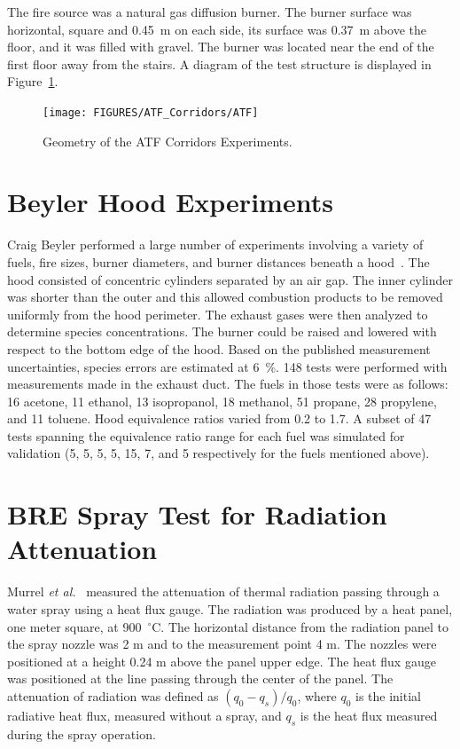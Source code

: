 The fire source was a natural gas diffusion burner.  The burner surface was horizontal, square and 0.45~m on each side, its surface was 0.37~m above the floor, and it was filled with gravel.
The burner was located near the end of the first floor away from the stairs. A diagram of the test structure is displayed in Figure~\ref{ATF Drawing}.


\begin{figure}
\begin{center}
\texttt{[image: FIGURES/ATF\_Corridors/ATF]}
\end{center}
\caption{Geometry of the ATF Corridors Experiments.}
\label{ATF Drawing}
\end{figure}

\clearpage



\section{Beyler Hood Experiments}

Craig Beyler performed a large number of experiments involving a variety of fuels, fire sizes, burner diameters, and
burner distances beneath a hood~\cite{Beyler:Hood}.  The hood consisted of concentric cylinders separated
by an air gap.  The inner cylinder was shorter than the outer and this allowed combustion products to be removed
uniformly from the hood perimeter.  The exhaust gases were then analyzed to determine species concentrations.
The burner could be raised and lowered with respect to the bottom edge of the hood.  Based on the published
measurement uncertainties, species errors are estimated at 6~\%.  148 tests were performed with measurements made in the
exhaust duct.  The fuels in those tests were as follows: 16 acetone, 11 ethanol, 13 isopropanol, 18 methanol, 51 propane, 28 propylene, and 11 toluene.
Hood equivalence ratios varied from 0.2 to 1.7.  A subset of 47 tests spanning the equivalence ratio range for each fuel was simulated for
validation (5, 5, 5, 5, 15, 7, and 5 respectively for the fuels mentioned above).



\section{BRE Spray Test for Radiation Attenuation}

Murrel {\em et al.}~\cite{Murrel:1995} measured the attenuation of thermal radiation passing through a water
spray using a heat flux gauge. The radiation was produced by a heat panel, one meter square, at 900~$^\circ$C. The horizontal distance
from the radiation panel to the spray nozzle was 2 m and to the measurement point 4 m. The nozzles were positioned at
a height 0.24 m above the panel upper edge. The heat flux gauge was positioned at the line passing through the center
of the panel. The attenuation of radiation was defined as $(q_0-q_s)/q_0$, where $q_0$ is the initial radiative heat flux,
measured without a spray, and $q_s$ is the heat flux measured during the spray operation.


